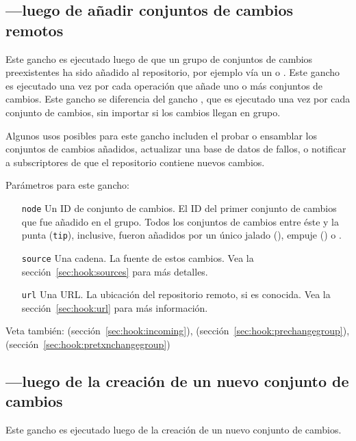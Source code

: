 \subsection{---luego de añadir conjuntos de cambios
remotos}
\label{sec:hook:changegroup}

Este gancho es ejecutado luego de que un grupo de conjuntos de cambios
preexistentes ha sido añadido al repositorio, por ejemplo vía un
 o .  Este gancho es ejecutado una vez por
cada operación que añade uno o más conjuntos de cambios. Este gancho
se diferencia del gancho , que es ejecutado una vez por
cada conjunto de cambios, sin importar si los cambios llegan en grupo.

Algunos usos posibles para este gancho includen el probar o ensamblar
los conjuntos de cambios añadidos, actualizar una base de datos de
fallos, o notificar a subscriptores de que el repositorio contiene
nuevos cambios.

Parámetros para este gancho:
\begin{itemize}
\item[\texttt{node}] Un ID de conjunto de cambios. El ID del primer conjunto
  de cambios que fue añadido en el grupo. Todos los conjuntos de
  cambios entre éste y la punta
  (\texttt{tip}), inclusive, fueron añadidos
  por un único jalado (), empuje () o .
\item[\texttt{source}] Una cadena. La fuente de estos cambios. Vea la
  sección~\ref{sec:hook:sources} para más detalles.
\item[\texttt{url}] Una URL. La ubicación del repositorio remoto, si
  es conocida. Vea la sección~\ref{sec:hook:url} para más información.
\end{itemize}

Veta también:  (sección~\ref{sec:hook:incoming}),
 (sección~\ref{sec:hook:prechangegroup}),
 (sección~\ref{sec:hook:pretxnchangegroup})

\subsection{---luego de la creación de un nuevo conjunto
de cambios}
\label{sec:hook:commit}

Este gancho es ejecutado luego de la creación de un nuevo conjunto de
cambios.

